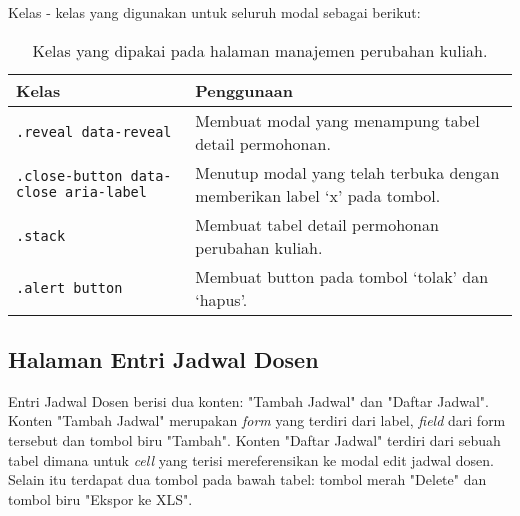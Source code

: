 \noindent Kelas - kelas yang digunakan untuk seluruh modal sebagai berikut:
\begin{table}[H]
	\centering
	\begin{tabularx}{\textwidth}{lX}
		\toprule
		Kelas     & Penggunaan \\
		\midrule
		\texttt{.reveal data-reveal} & Membuat modal yang menampung tabel detail permohonan.\\
		\texttt{.close-button data-close aria-label} & Menutup modal yang telah terbuka dengan memberikan label `x' pada tombol.\\
		\texttt{.stack} &	Membuat tabel detail permohonan perubahan kuliah.\\
		\texttt{.alert button} & Membuat button pada tombol `tolak'  dan `hapus'.\\
		\bottomrule
	\end{tabularx}%
	\caption{Kelas yang dipakai pada halaman manajemen perubahan kuliah.}
\end{table}


\subsection{Halaman Entri Jadwal Dosen}
Entri Jadwal Dosen berisi dua konten: "Tambah Jadwal" dan "Daftar Jadwal". Konten "Tambah Jadwal" merupakan \textit{form} yang terdiri dari label, \textit{field} dari form tersebut dan tombol biru "Tambah". Konten "Daftar Jadwal" terdiri dari sebuah tabel dimana untuk \textit{cell} yang terisi mereferensikan ke modal edit jadwal dosen. Selain itu terdapat dua tombol pada bawah tabel: tombol merah "Delete" dan tombol biru "Ekspor ke XLS".

